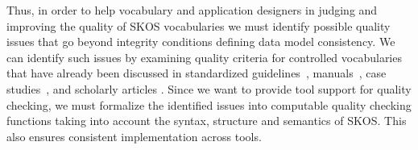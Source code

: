 Thus, in order to help vocabulary and application designers in judging and improving the quality of SKOS vocabularies we must identify possible quality issues that go beyond integrity conditions defining data model consistency. We can identify such issues by examining quality criteria for controlled vocabularies that have already been discussed in standardized guidelines~\cite{ISO25964-1:2011,Z39.19:2005}, manuals~\cite{Svenonius2003,Hedden2010,Aitchison2000,Harpring2010}, case studies~\cite{Soergel1995}, and scholarly articles \cite{Coronado2009,Soergel1997,Soergel2002,Elkin2002,Kless2010}. Since we want to provide tool support for quality checking, we must formalize the identified issues into computable quality checking functions taking into account the syntax, structure and semantics of SKOS. This also ensures consistent implementation across tools.









